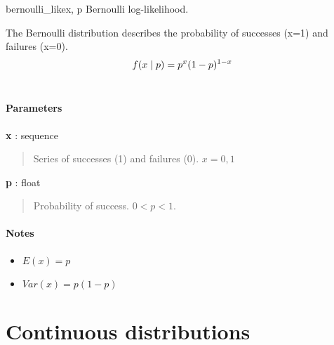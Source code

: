 \hypertarget{pymc.distributions.bernoulli_like}{}
\begin{funcdesc}{bernoulli\_like}{x, p}
Bernoulli log-likelihood.

The Bernoulli distribution describes the probability of successes (x=1) and
failures (x=0).
\begin{gather}
\begin{split}f(x \mid p) = p^{x} (1-p)^{1-x}\end{split}\notag\\\begin{split}\end{split}\notag
\end{gather}
\paragraph{Parameters}
\begin{paramlist}
\item[] \textbf{x} : sequence
\begin{quote}

Series of successes (1) and failures (0). $x=0,1$
\end{quote}

\item[] \textbf{p} : float
\begin{quote}

Probability of success. $0 < p < 1$.
\end{quote}
\end{paramlist}
\paragraph{Notes}
\begin{itemize}
\item {} 
$E(x)= p$

\item {} 
$Var(x)= p(1-p)$

\end{itemize}

\end{funcdesc}

\section{Continuous distributions}


